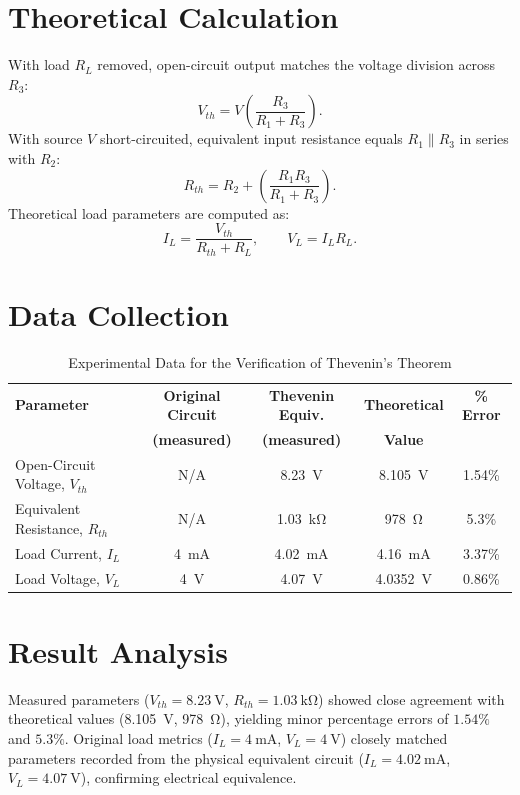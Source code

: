 \section{Theoretical Calculation}
With load $R_L$ removed, open-circuit output matches the voltage division across $R_3$:
\[
V_{th} = V\left(\frac{R_3}{R_1+R_3}\right).
\]
With source $V$ short-circuited, equivalent input resistance equals $R_1 \parallel R_3$ in series with $R_2$:
\[
R_{th} = R_2 + \left(\frac{R_1 R_3}{R_1+R_3}\right).
\]
Theoretical load parameters are computed as:
\[
I_L = \frac{V_{th}}{R_{th}+R_L}, \qquad V_L = I_L R_L.
\]

\section{Data Collection}
\begin{table}[h!]
	\centering
	\caption{Experimental Data for the Verification of Thevenin's Theorem}
	\vspace{2mm}
	\begin{tabular}{lcccc}
		\toprule
		\rowcolor{blue!10}
		\textbf{Parameter} & \textbf{Original Circuit} & \textbf{Thevenin Equiv.} & \textbf{Theoretical} & \textbf{\% Error} \\
		& \textbf{(measured)} & \textbf{(measured)} & \textbf{Value} & \\
		\midrule
		Open-Circuit Voltage, $V_{th}$ & N/A & \qty{8.23}{\volt} & \qty{8.105}{\volt} & 1.54\% \\
		Equivalent Resistance, $R_{th}$ & N/A & \qty{1.03}{\kilo\ohm} & \qty{978}{\ohm} & 5.3\% \\
		Load Current, $I_L$ & \qty{4}{\milli\ampere} & \qty{4.02}{\milli\ampere} & \qty{4.16}{\milli\ampere} & 3.37\% \\
		Load Voltage, $V_L$ & \qty{4}{\volt} & \qty{4.07}{\volt} & \qty{4.0352}{\volt} & 0.86\% \\
		\bottomrule
	\end{tabular}
	\label{tab:thevdata}
\end{table}

\section{Result Analysis}
Measured parameters ($V_{th}=\qty{8.23}{\volt}$, $R_{th}=\qty{1.03}{\kilo\ohm}$) showed close agreement with theoretical values (\qty{8.105}{\volt}, \qty{978}{\ohm}), yielding minor percentage errors of $1.54\%$ and $5.3\%$. Original load metrics ($I_L=\qty{4}{\milli\ampere}$, $V_L=\qty{4}{\volt}$) closely matched parameters recorded from the physical equivalent circuit ($I_L=\qty{4.02}{\milli\ampere}$, $V_L=\qty{4.07}{\volt}$), confirming electrical equivalence.

